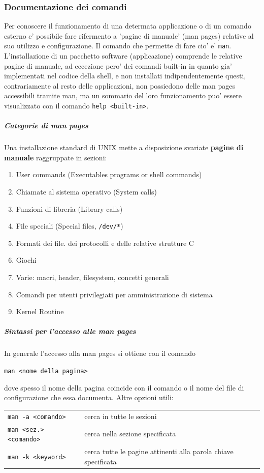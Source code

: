 {\pagebreak}

\subsubsection{Documentazione dei comandi}
Per conoscere il funzionamento di una determata applicazione o di un comando esterno e' possibile fare 
rifermento a 'pagine di manuale' (man pages) relative al suo utilizzo e configurazione. 
Il comando che permette di fare cio' e' \texttt{man}. L'installazione di un pacchetto software (applicazione)
comprende le relative pagine di manuale, ad eccezione pero' dei comandi built-in in quanto gia' implementati 
nel codice della shell, e non installati indipendentemente questi, contrariamente al resto delle 
applicazioni, non possiedono delle man pages accessibili tramite man, ma un sommario del loro funzionamento puo'
essere visualizzato con il comando \texttt{help <built-in>}.

\subparagraph{Categorie di man pages}
Una installazione standard di UNIX mette a disposizione svariate \textbf{pagine di manuale} raggruppate in
sezioni:
	\begin{enumerate}
		\item User commands (Executables programs or shell commands)
		\item Chiamate al sistema operativo (System calls)
		\item Funzioni di libreria (Library calls)
		\item File speciali (Special files, \texttt{/dev/*})
		\item Formati dei file. dei protocolli e delle relative strutture C
		\item Giochi
		\item Varie: macri, header, filesystem, concetti generali
		\item Comandi per utenti privilegiati per amministrazione di sistema
		\item Kernel Routine
	\end{enumerate}

\subparagraph{Sintassi per l'accesso alle man pages}
In generale l'accesso alla man pages si ottiene con il comando \\
\begin{center}
	\texttt{man <nome della pagina>}
\end{center}
dove spesso il nome della pagina coincide con il comando o il nome del file di configurazione che essa documenta.
Altre opzioni utili:
\begin{center}
\begin{tabular}{ll}
	\texttt{man -a <comando>} & cerca in tutte le sezioni \\
	\texttt{man <sez.> <comando>} & cerca nella sezione specificata \\
	\texttt{man -k <keyword>} & cerca tutte le pagine attinenti alla parola chiave specificata \\
\end{tabular}
	
\end{center}

